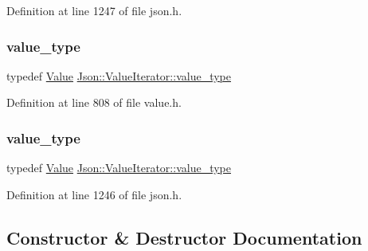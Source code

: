 Definition at line 1247 of file json.\+h.

\hypertarget{class_json_1_1_value_iterator_a2c5ba7be611f05546530c8a88b2d2e37}{}\label{class_json_1_1_value_iterator_a2c5ba7be611f05546530c8a88b2d2e37} 
\subsubsection{\texorpdfstring{value\+\_\+type}{value\_type}\hspace{0.1cm}{\footnotesize\ttfamily [1/2]}}
{\footnotesize\ttfamily typedef \hyperlink{class_json_1_1_value}{Value} \hyperlink{class_json_1_1_value_iterator_a2c5ba7be611f05546530c8a88b2d2e37}{Json\+::\+Value\+Iterator\+::value\+\_\+type}}



Definition at line 808 of file value.\+h.

\hypertarget{class_json_1_1_value_iterator_a2c5ba7be611f05546530c8a88b2d2e37}{}\label{class_json_1_1_value_iterator_a2c5ba7be611f05546530c8a88b2d2e37} 
\subsubsection{\texorpdfstring{value\+\_\+type}{value\_type}\hspace{0.1cm}{\footnotesize\ttfamily [2/2]}}
{\footnotesize\ttfamily typedef \hyperlink{class_json_1_1_value}{Value} \hyperlink{class_json_1_1_value_iterator_a2c5ba7be611f05546530c8a88b2d2e37}{Json\+::\+Value\+Iterator\+::value\+\_\+type}}



Definition at line 1246 of file json.\+h.



\subsection{Constructor \& Destructor Documentation}
\hypertarget{class_json_1_1_value_iterator_a09425cf4dc12244072a942f290a5c0ec}{}\label{class_json_1_1_value_iterator_a09425cf4dc12244072a942f290a5c0ec} 
